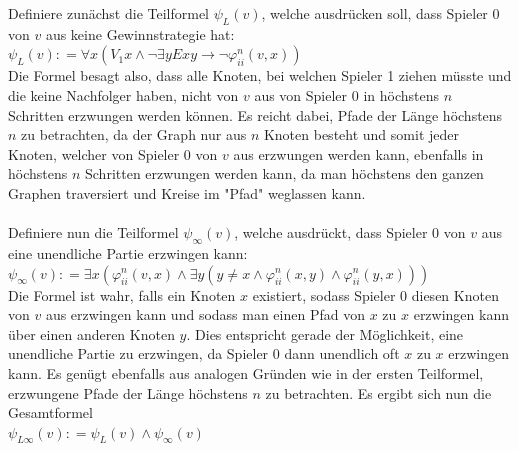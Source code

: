 \documentclass[11pt, a4paper]{article}
\newcommand{\defgr}{\mathrel{\mathop:\!\!=}}
\begin{document}
\begin{adjustwidth}{20pt}{20pt}
Definiere zunächst die Teilformel $\psi_L(v)$, welche ausdrücken soll, dass Spieler 0 von $v$ aus keine Gewinnstrategie hat:\\
$\psi_L(v) \defgr \forall x(V_1x \wedge \neg\exists yExy \rightarrow \neg\varphi^n_{ii}(v,x) )$\\
Die Formel besagt also, dass alle Knoten, bei welchen Spieler 1 ziehen müsste und die keine Nachfolger haben, nicht von $v$ aus von Spieler 0 in höchstens $n$ Schritten erzwungen werden
können. Es reicht dabei, Pfade der Länge höchstens $n$ zu betrachten, da der Graph nur aus $n$ Knoten besteht und somit jeder Knoten, welcher von Spieler 0 von $v$ aus erzwungen
werden kann, ebenfalls in höchstens $n$ Schritten erzwungen werden kann, da man höchstens den ganzen Graphen traversiert und Kreise im "Pfad" weglassen kann.\\ \ \\
Definiere nun die Teilformel $\psi_\infty(v)$, welche ausdrückt, dass Spieler 0 von $v$ aus eine unendliche Partie erzwingen kann:\\
$\psi_\infty(v) \defgr \exists x(\varphi^n_{ii}(v,x) \wedge \exists y(y \neq x \wedge \varphi^n_{ii}(x,y) \wedge \varphi^n_{ii}(y,x)))$\\
Die Formel ist wahr, falls ein Knoten $x$ existiert, sodass Spieler 0 diesen Knoten von $v$ aus erzwingen kann und sodass man einen Pfad von $x$ zu $x$ erzwingen kann über einen
anderen Knoten $y$. Dies entspricht gerade der Möglichkeit, eine unendliche Partie zu erzwingen, da Spieler 0 dann unendlich oft $x$ zu $x$ erzwingen kann. Es genügt ebenfalls
aus analogen Gründen wie in der ersten Teilformel, erzwungene Pfade der Länge höchstens $n$ zu betrachten. Es ergibt sich nun die Gesamtformel\\
$\psi_{L\infty}(v) \defgr \psi_L(v) \wedge \psi_\infty(v)$
\end{adjustwidth}
\end{document}
